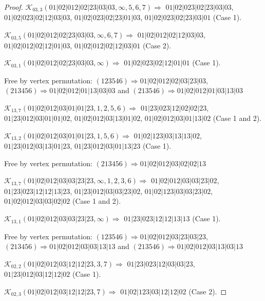\documentclass[12pt]{article}
\theoremstyle{plain}
\theoremstyle{definition}
\theoremstyle{remark}
\newcommand{\fancy}[1]{\mathcal{#1}}
\def\K{\fancy{K}}
\begin{document}
\begin{proof}
	
	
	\bigskip
	
	$\K_{03,3}(01|02|012|02|23|03|03,\infty,5, 6, 7)\Rightarrow $ $01|02|023|02|23|03|03$, $01|02|023|02|12|03|03$, $01|02|023|02|23|01|03$, $01|02|023|02|23|03|01$ (Case 1).
	
	$\K_{03,5}(01|02|012|02|23|03|03,\infty,6, 7)\Rightarrow $ $01|02|012|02|12|03|03$, $01|02|012|02|12|01|03$, $01|02|012|02|12|03|01$ (Case 2).
	
	$\K_{03,1}(01|02|012|02|23|03|03,\infty)\Rightarrow $ $01|02|023|02|12|01|01$ (Case 1).
	
	
	
	Free by vertex permutation: $(1 2 3 5 4 6)\Rightarrow 01|02|012|02|03|23|03$, $(2 1 3 4 5 6)\Rightarrow 01|02|012|01|13|03|03$ and $(2 1 3 5 4 6)\Rightarrow 01|02|012|01|03|13|03$
	
	
	
	\bigskip
	
	$\K_{13,7}(01|02|012|03|01|01|23,1, 2, 5, 6)\Rightarrow $ $01|23|023|12|02|02|23$, $01|23|012|03|01|01|02$, $01|02|012|03|13|01|02$, $01|02|012|03|01|13|02$ (Case 1 and 2).
	
	$\K_{13,2}(01|02|012|03|01|01|23,1, 5, 6)\Rightarrow $ $01|02|123|03|13|13|02$, $01|23|012|03|13|01|23$, $01|23|012|03|01|13|23$ (Case 1).
	
	
	
	Free by vertex permutation: $(2 1 3 4 5 6)\Rightarrow 01|02|012|03|02|02|13$
	
	
	
	\bigskip
	
	$\K_{13,7}(01|02|012|03|03|23|23,\infty,1, 2, 3, 6)\Rightarrow $ $01|02|012|03|03|23|02$, $01|23|023|12|12|13|23$, $01|23|012|03|03|23|02$, $01|02|123|03|03|23|02$, $01|02|012|03|03|02|02$ (Case 1 and 2).
	
	$\K_{13,1}(01|02|012|03|03|23|23,\infty)\Rightarrow $ $01|23|023|12|12|13|13$ (Case 1).
	
	
	
	Free by vertex permutation: $(1 2 3 5 4 6)\Rightarrow 01|02|012|03|23|03|23$, $(2 1 3 4 5 6)\Rightarrow 01|02|012|03|03|13|13$ and $(2 1 3 5 4 6)\Rightarrow 01|02|012|03|13|03|13$
	
	
	
	\bigskip
	
	$\K_{02,2}(01|02|012|03|12|12|23,3, 7)\Rightarrow $ $01|23|023|12|03|03|23$, $01|23|012|03|12|12|02$ (Case 1).
	
	$\K_{02,3}(01|02|012|03|12|12|23,7)\Rightarrow $ $01|02|123|03|12|12|02$ (Case 2).
	

\end{proof}
\end{document}
